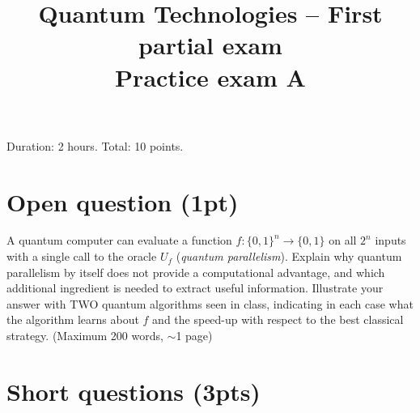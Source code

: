 \documentclass[11pt,a4paper]{article}
\title{Quantum Technologies -- First partial exam\\[4pt] \large Practice exam A}
\date{}
\begin{document}
\maketitle
\vspace{-1.5cm}
\begin{center}
Duration: 2 hours. Total: 10 points.
\end{center}

\section{Open question (1pt)}

A quantum computer can evaluate a function $f:\{0,1\}^n\to\{0,1\}$ on all $2^n$ inputs with a
single call to the oracle $U_f$ (\emph{quantum parallelism}). Explain why quantum parallelism by itself
does not provide a computational advantage, and which additional ingredient is needed to extract
useful information. Illustrate your answer with TWO quantum algorithms seen in class, indicating
in each case what the algorithm learns about $f$ and the speed-up with respect to the best
classical strategy. (Maximum 200 words, $\sim$1 page)

\section{Short questions (3pts)}
\end{document}
